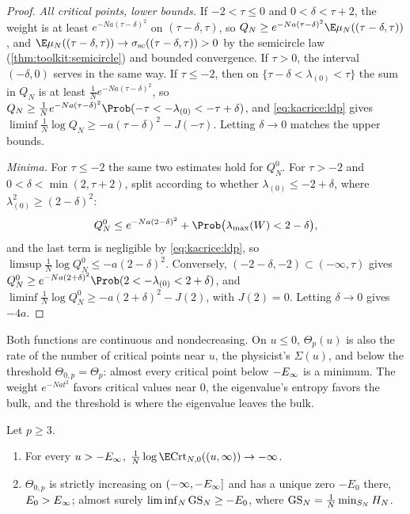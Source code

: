 \begin{refsection}
\begin{proof}
\emph{All critical points, lower bounds.} If $-2<\tau\le0$ and $0<\delta<\tau+2$, the weight is at least $e^{-Na(\tau-\delta)^2}$ on $(\tau-\delta,\tau)$, so $Q_N\ge e^{-Na(\tau-\delta)^2}\E\mu_N((\tau-\delta,\tau))$, and $\E\mu_N((\tau-\delta,\tau))\to\sigma_{\mathrm{sc}}((\tau-\delta,\tau))>0$ by the semicircle law (\cref{thm:toolkit:semicircle}) and bounded convergence. If $\tau>0$, the interval $(-\delta,0)$ serves in the same way. If $\tau\le-2$, then on $\{\tau-\delta<\lambda_{(0)}<\tau\}$ the sum in $Q_N$ is at least $\frac1Ne^{-Na(\tau-\delta)^2}$, so $Q_N\ge\frac1Ne^{-Na(\tau-\delta)^2}\Prob(-\tau<-\lambda_{(0)}<-\tau+\delta)$, and \eqref{eq:kacrice:ldp} gives $\liminf\frac1N\log Q_N\ge-a(\tau-\delta)^2-J(-\tau)$. Letting $\delta\to0$ matches the upper bounds.

\emph{Minima.} For $\tau\le-2$ the same two estimates hold for $Q^0_N$. For $\tau>-2$ and $0<\delta<\min(2,\tau+2)$, split according to whether $\lambda_{(0)}\le-2+\delta$, where $\lambda_{(0)}^2\ge(2-\delta)^2$:
\[
Q^0_N\le e^{-Na(2-\delta)^2}+\Prob\bigl(\lambda_{\max}(W)<2-\delta\bigr),
\]
and the last term is negligible by \eqref{eq:kacrice:ldp}, so $\limsup\frac1N\log Q^0_N\le-a(2-\delta)^2$. Conversely, $(-2-\delta,-2)\subset(-\infty,\tau)$ gives $Q^0_N\ge e^{-Na(2+\delta)^2}\Prob(2<-\lambda_{(0)}<2+\delta)$, and $\liminf\frac1N\log Q^0_N\ge-a(2+\delta)^2-J(2)$, with $J(2)=0$. Letting $\delta\to0$ gives $-4a$.
\end{proof}

Both functions are continuous and nondecreasing. On $u\le0$, $\Theta_p(u)$ is also the rate of the number of critical points near $u$, the physicist's $\Sigma(u)$, and below the threshold $\Theta_{0,p}=\Theta_p$: almost every critical point below $-E_\infty$ is a minimum. The weight $e^{-Nat^2}$ favors critical values near $0$, the eigenvalue's entropy favors the bulk, and the threshold is where the eigenvalue leaves the bulk.

\begin{corollary}\label{cor:kacrice:groundstate}
Let $p\ge3$.
\begin{enumerate}
\item For every $u>-E_\infty$, $\frac1N\log\E\kacriceCrt_{N,0}((u,\infty))\to-\infty$.
\item $\Theta_{0,p}$ is strictly increasing on $(-\infty,-E_\infty]$ and has a unique zero $-E_0$ there, $E_0>E_\infty$; almost surely $\liminf_N\mathrm{GS}_N\ge-E_0$, where $\mathrm{GS}_N=\frac1N\min_{S_N}H_N$.
\end{enumerate}
\end{corollary}


\end{refsection}
